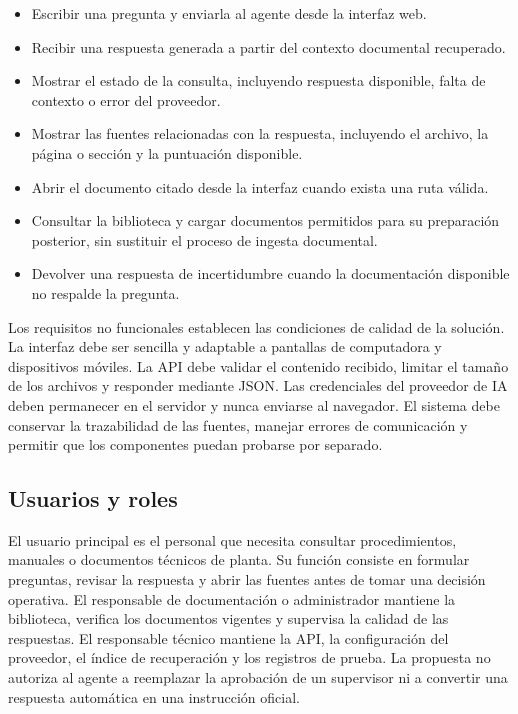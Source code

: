 \begin{itemize}
    \item Escribir una pregunta y enviarla al agente desde la interfaz web.
    \item Recibir una respuesta generada a partir del contexto documental recuperado.
    \item Mostrar el estado de la consulta, incluyendo respuesta disponible, falta de contexto o error del proveedor.
    \item Mostrar las fuentes relacionadas con la respuesta, incluyendo el archivo, la página o sección y la puntuación disponible.
    \item Abrir el documento citado desde la interfaz cuando exista una ruta válida.
    \item Consultar la biblioteca y cargar documentos permitidos para su preparación posterior, sin sustituir el proceso de ingesta documental.
    \item Devolver una respuesta de incertidumbre cuando la documentación disponible no respalde la pregunta.
\end{itemize}

Los requisitos no funcionales establecen las condiciones de calidad de la solución. La interfaz debe ser sencilla y adaptable a pantallas de computadora y dispositivos móviles. La API debe validar el contenido recibido, limitar el tamaño de los archivos y responder mediante JSON. Las credenciales del proveedor de IA deben permanecer en el servidor y nunca enviarse al navegador. El sistema debe conservar la trazabilidad de las fuentes, manejar errores de comunicación y permitir que los componentes puedan probarse por separado.

\subsection{Usuarios y roles}

El usuario principal es el personal que necesita consultar procedimientos, manuales o documentos técnicos de planta. Su función consiste en formular preguntas, revisar la respuesta y abrir las fuentes antes de tomar una decisión operativa. El responsable de documentación o administrador mantiene la biblioteca, verifica los documentos vigentes y supervisa la calidad de las respuestas. El responsable técnico mantiene la API, la configuración del proveedor, el índice de recuperación y los registros de prueba. La propuesta no autoriza al agente a reemplazar la aprobación de un supervisor ni a convertir una respuesta automática en una instrucción oficial.

